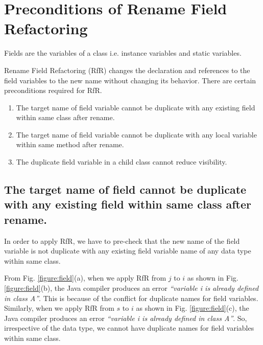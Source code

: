 \section{\textbf{Preconditions of Rename Field Refactoring}}
Fields are the variables of a class i.e. instance variables and static variables.

Rename Field Refactoring (RfR) changes the declaration and references to the field variables to the new name without changing its behavior.
There are certain preconditions required for RfR.

\begin{enumerate}
	\item The target name of field variable cannot be duplicate with any existing field within same class after rename.
	\item The target name of field variable cannot be duplicate with any local variable within same method after rename.
	\item The duplicate field variable in a child class cannot reduce visibility. 
\end{enumerate}

\subsection{The target name of field cannot be duplicate with any existing field within same class after rename.}

In order to apply RfR, we have to pre-check that the new name of the field variable is not duplicate with any existing field variable name of any data type within same class. 

From Fig. \ref{figure:field}(a), when we apply RfR from $j$ to $i$ as shown in Fig. \ref{figure:field}(b), the Java compiler produces an error \textit{``variable i is already defined in class A''}. This is because of the conflict for duplicate names for field variables. Similarly, when we apply RfR from $s$ to $i$ as shown in Fig. \ref{figure:field}(c), the Java compiler produces an error \textit{``variable i is already defined in class A''}. So, irrespective of the data type, we cannot have duplicate names for field variables within same class.

